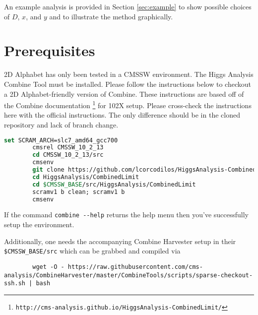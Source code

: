 \documentclass[letter]{article}
\begin{document}
    An example analysis is provided in Section \ref{sec:example} to show possible choices of $D$, $x$, and $y$ and to illustrate the method graphically.

\section{Prerequisites}
    2D Alphabet has only been tested in a CMSSW environment. The Higgs Analysis Combine Tool must be installed. Please follow the instructions below to checkout a 2D Alphabet-friendly version of Combine. These instructions are based off of the Combine documentation \footnote{\verb"http://cms-analysis.github.io/HiggsAnalysis-CombinedLimit/"} for 102X setup. Please cross-check the instructions here with the official instructions. The only difference should be in the cloned repository and lack of branch change.

    \begin{lstlisting}[language=csh]
        set SCRAM_ARCH=slc7_amd64_gcc700
        cmsrel CMSSW_10_2_13
        cd CMSSW_10_2_13/src
        cmsenv
        git clone https://github.com/lcorcodilos/HiggsAnalysis-CombinedLimit.git HiggsAnalysis/CombinedLimit
        cd HiggsAnalysis/CombinedLimit
        cd $CMSSW_BASE/src/HiggsAnalysis/CombinedLimit
        scramv1 b clean; scramv1 b
        cmsenv
    \end{lstlisting}

    If the command \verb"combine --help" returns the help menu then you've successfully setup the environment.

    Additionally, one needs the accompanying Combine Harvester setup in their \verb"$CMSSW_BASE/src" which can be grabbed and compiled via 

    \begin{lstlisting}
        wget -O - https://raw.githubusercontent.com/cms-analysis/CombineHarvester/master/CombineTools/scripts/sparse-checkout-ssh.sh | bash
    \end{lstlisting}

\end{document}
